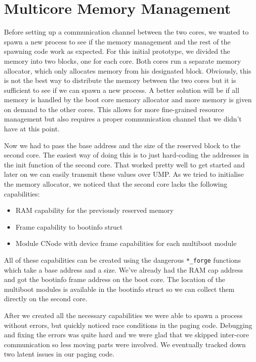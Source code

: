 \section{Multicore Memory Management}

Before setting up a communication channel between the two cores, we wanted to spawn a new process to see if the 
memory management and the rest of the spawning code work as expected. For this initial prototype, we divided 
the memory into two blocks, one for each core. Both cores run a separate memory allocator, which only allocates 
memory from his designated block. Obviously, this is not the best way to distribute the memory between the two 
cores but it is sufficient to see if we can spawn a new process. A better solution will be if all memory is 
handled by the boot core memory allocator and more memory is given on demand to the other cores. This allows 
for more fine-grained resource management but also requires a proper communication channel that we didn't have 
at this point.

Now we had to pass the base address and the size of the reserved block to the second core. The easiest way of 
doing this is to just hard-coding the addresses in the init function of the second core. That worked pretty well 
to get started and later on we can easily transmit these values over UMP. As we tried to initialise the memory 
allocator, we noticed that the second core lacks the following capabilities: 
\begin{itemize}
    \item RAM capability for the previously reserved memory
    \item Frame capability to bootinfo struct
    \item Module CNode with device frame capabilities for each multiboot module
\end{itemize}
All of these capabilities can be created using the dangerous \verb|*_forge| functions which take a base address 
and a size. We've already had the RAM cap address and got the bootinfo frame address on the boot core. The 
location of the multiboot modules is available in the bootinfo struct so we can collect them directly on the 
second core.

After we created all the necessary capabilities we were able to spawn a process without errors, but quickly 
noticed race conditions in the paging code. Debugging and fixing the errors was quite hard and we were glad that 
we skipped inter-core communication so less moving parts were involved. We eventually tracked down two latent 
issues in our paging code.

